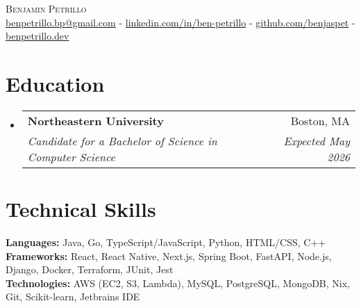 \documentclass[letterpaper,11pt]{article}
\makeatletter
\newcommand{\resumeSubheading}[4]{
  \vspace{-10pt}\item
    \begin{tabular*}{1.0\textwidth}[t]{l@{\extracolsep{\fill}}r}
      \textbf{#1} & \small #2 \\
      \textit{\small#3} & \textit{\small #4} \\
    \end{tabular*}\vspace{-5pt}
}
\newcommand{\resumeSubHeadingListStart}{\begin{itemize}[leftmargin=0.0in, label={}]}
\newcommand{\resumeSubHeadingListEnd}{\end{itemize}}
\makeatother
\begin{document}
\begin{center}
    {\Huge \scshape Benjamin Petrillo} \vspace{2pt} \\ 
    \href{mailto:benpetrillo.bp@gmail.com}{benpetrillo.bp@gmail.com} - \href{https://linkedin.com/in/ben-petrillo}{linkedin.com/in/ben-petrillo} - \href{https://github.com/benjaspet}{github.com/benjaspet} - \href{https://benpetrillo.dev}{benpetrillo.dev}
    \vspace{-8pt}
\end{center}

\section{Education}
    \resumeSubHeadingListStart
        \resumeSubheading
        {Northeastern University}{Boston, MA}
        {Candidate for a Bachelor of Science in Computer Science}
        {Expected May 2026}
    \resumeSubHeadingListEnd
    \vspace{-12pt}

\section{Technical Skills}
 \vspace{-10pt}
 \begin{itemize}[leftmargin=0.05in, label={}]
    \small{\item{
     \textbf{Languages: }{Java, Go, TypeScript/JavaScript, Python, HTML/CSS, C++} \\
     \textbf{Frameworks: }{React, React Native, Next.js, Spring Boot, FastAPI, Node.js, Django, Docker, Terraform, JUnit, Jest} \\
     \textbf{Technologies: }{AWS (EC2, S3, Lambda), MySQL, PostgreSQL, MongoDB, Nix, Git, Scikit-learn, Jetbrains IDE}
    }}
 \end{itemize}
 \vspace{-18pt}

\end{document}
